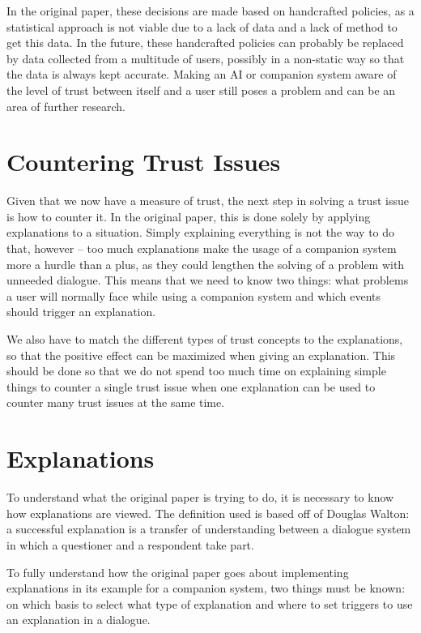 \documentclass[a4paper]{article}
\begin{document}
In the original paper, these decisions are made based on handcrafted policies, as a statistical approach is not viable due to a lack of data and a lack of method to get this data. In the future, these handcrafted policies can probably be replaced by data collected from a multitude of users, possibly in a non-static way so that the data is always kept accurate. Making an AI or companion system aware of the level of trust between itself and a user still poses a problem and can be an area of further research.

\section{Countering Trust Issues}

Given that we now have a measure of trust, the next step in solving a trust issue is how to counter it. In the original paper, this is done solely by applying explanations to a situation. Simply explaining everything is not the way to do that, however – too much explanations make the usage of a companion system more a hurdle than a plus, as they could lengthen the solving of a problem with unneeded dialogue. This means that we need to know two things: what problems a user will normally face while using a companion system and which events should trigger an explanation.

We also have to match the different types of trust concepts to the explanations, so that the positive effect can be maximized when giving an explanation. This should be done so that we do not spend too much time on explaining simple things to counter a single trust issue when one explanation can be used to counter many trust issues at the same time.

\section{Explanations}

To understand what the original paper is trying to do, it is necessary to know how explanations are viewed. The definition used is based off of Douglas Walton: a successful explanation is a transfer of understanding between a dialogue system in which a questioner and a respondent take part.\cite{walton2004new}

To fully understand how the original paper goes about implementing explanations in its example for a companion system, two things must be known: on which basis to select what type of explanation and where to set triggers to use an explanation in a dialogue.
\end{document}
